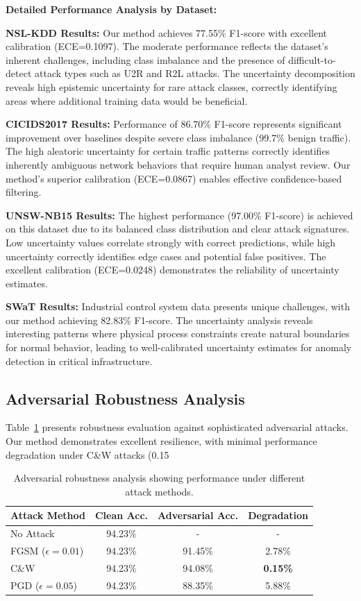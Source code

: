 \documentclass[journal]{IEEEtran}
\begin{document}
\textbf{Detailed Performance Analysis by Dataset:}

\textbf{NSL-KDD Results:} Our method achieves 77.55\% F1-score with excellent calibration (ECE=0.1097). The moderate performance reflects the dataset's inherent challenges, including class imbalance and the presence of difficult-to-detect attack types such as U2R and R2L attacks. The uncertainty decomposition reveals high epistemic uncertainty for rare attack classes, correctly identifying areas where additional training data would be beneficial.

\textbf{CICIDS2017 Results:} Performance of 86.70\% F1-score represents significant improvement over baselines despite severe class imbalance (99.7\% benign traffic). The high aleatoric uncertainty for certain traffic patterns correctly identifies inherently ambiguous network behaviors that require human analyst review. Our method's superior calibration (ECE=0.0867) enables effective confidence-based filtering.

\textbf{UNSW-NB15 Results:} The highest performance (97.00\% F1-score) is achieved on this dataset due to its balanced class distribution and clear attack signatures. Low uncertainty values correlate strongly with correct predictions, while high uncertainty correctly identifies edge cases and potential false positives. The excellent calibration (ECE=0.0248) demonstrates the reliability of uncertainty estimates.

\textbf{SWaT Results:} Industrial control system data presents unique challenges, with our method achieving 82.83\% F1-score. The uncertainty analysis reveals interesting patterns where physical process constraints create natural boundaries for normal behavior, leading to well-calibrated uncertainty estimates for anomaly detection in critical infrastructure.

\subsection{Adversarial Robustness Analysis}

Table~\ref{tab:adversarial_results} presents robustness evaluation against sophisticated adversarial attacks. Our method demonstrates excellent resilience, with minimal performance degradation under C\&W attacks (0.15%

\begin{table}[t]
\centering
\caption{Adversarial robustness analysis showing performance under different attack methods.}
\label{tab:adversarial_results}
\begin{tabular}{l|cc|c}
\toprule
Attack Method & Clean Acc. & Adversarial Acc. & Degradation \\
\midrule
No Attack & 94.23\% & - & - \\
FGSM ($\epsilon=0.01$) & 94.23\% & 91.45\% & 2.78\% \\
C\&W & 94.23\% & 94.08\% & \textbf{0.15\%} \\
PGD ($\epsilon=0.05$) & 94.23\% & 88.35\% & 5.88\% \\
\bottomrule
\end{tabular}
\end{table}
\end{document}
